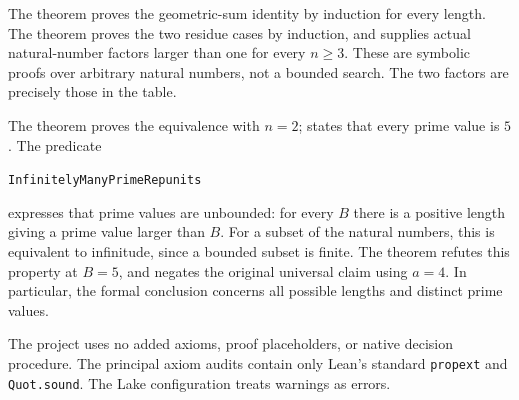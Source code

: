 \documentclass[11pt]{article}
\begin{document}
The theorem  proves the geometric-sum identity by induction for every length.
The theorem  proves the two residue cases by induction,
and  supplies actual natural-number factors
larger than one for every $n\ge3$. These are symbolic proofs over arbitrary natural numbers,
not a bounded search. The two factors are precisely those in the table.

The theorem  proves the equivalence with $n=2$;
 states that every prime value is $5$.
The predicate
\begin{center}\texttt{InfinitelyManyPrimeRepunits}\end{center}
expresses that prime values are unbounded:
for every $B$ there is a positive length giving a prime value larger than $B$.
For a subset of the natural numbers, this is equivalent to infinitude, since a bounded subset is finite.
The theorem  refutes this property at $B=5$,
and  negates the original universal claim using $a=4$.
In particular, the formal conclusion concerns all possible lengths and distinct prime values.

The project uses no added axioms, proof placeholders, or native decision procedure.
The principal axiom audits contain only Lean's standard \texttt{propext} and \texttt{Quot.sound}.
The Lake configuration treats warnings as errors.
\end{document}
